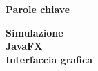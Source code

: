 
\clearemptydoublepage
\thispagestyle{empty}
\vspace*{20ex}
\begin{flushright}
    \begin{LARGE}
        \textbf{Parole chiave}\\
        \vspace{5ex}
    \end{LARGE}
    \begin{normalsize}
        \textbf{%
            Simulazione\\%
            \medskip
            JavaFX\\%
            \medskip
            Interfaccia grafica%
        }
    \end{normalsize}
\end{flushright}
\vfill
